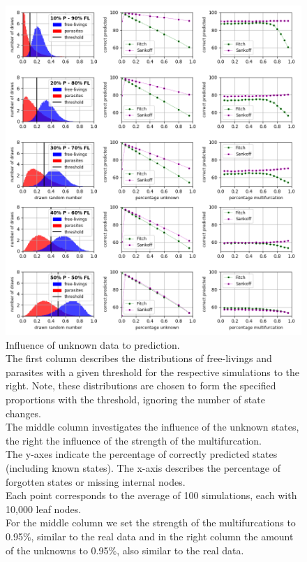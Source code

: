     \begin{figure}[h!]
      \centering
      \includegraphics[trim = 0mm 0mm 0mm 150mm, clip, width=\textwidth]{Figures/simulation_evaluation_1.png}
      \caption{Influence of unknown data to prediction. \\
        The first column describes the distributions of free-livings and parasites with a given 
          threshold for the respective simulations to the right. Note, these distributions are chosen 
          to form the specified proportions with the threshold, ignoring the number of state changes. \\
        The middle column investigates the influence of the unknown states, the right the influence of
          the strength of the multifurcation. \\
        The y-axes indicate the percentage of correctly predicted states (including known states). The 
          x-axis describes the percentage of forgotten states or missing internal nodes. \\
        Each point corresponds to the average of 100 simulations, each with 10,000 leaf nodes. \\
        For the middle column we set the strength of the multifurcations to 0.95\%, similar to the 
          real data and in the right column the amount of the unknowns to 0.95\%, also similar to the 
          real data.}
      \label{fig:influence of unknown data}
    \end{figure}

